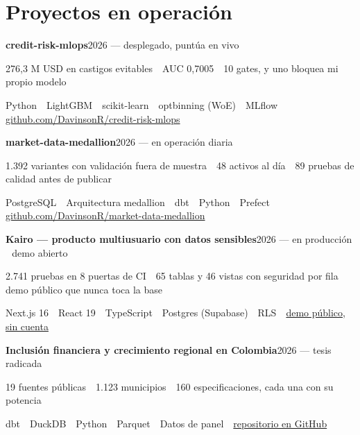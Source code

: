 \documentclass[a4paper,10pt]{article}
\newcommand{\row}[2]{\textbf{\color{ink}#1}\hfill{\small #2}\par}
\begin{document}
\section*{Proyectos en operación}
\row{credit-risk-mlops}{2026 --- desplegado, puntúa en vivo}{\small\color{ink} 276,3 M USD en castigos evitables \,\textperiodcentered\, AUC 0,7005 \,\textperiodcentered\, 10 gates, y uno bloquea mi propio modelo}\par{\small Python \,\textperiodcentered\, LightGBM \,\textperiodcentered\, scikit-learn \,\textperiodcentered\, optbinning (WoE) \,\textperiodcentered\, MLflow \,\textperiodcentered\, \href{https://github.com/DavinsonR/credit-risk-mlops}{github.com/DavinsonR/credit-risk-mlops}}\par
\vspace{1pt}
\row{market-data-medallion}{2026 --- en operación diaria}{\small\color{ink} 1.392 variantes con validación fuera de muestra \,\textperiodcentered\, 48 activos al día \,\textperiodcentered\, 89 pruebas de calidad antes de publicar}\par{\small PostgreSQL \,\textperiodcentered\, Arquitectura medallion \,\textperiodcentered\, dbt \,\textperiodcentered\, Python \,\textperiodcentered\, Prefect \,\textperiodcentered\, \href{https://github.com/DavinsonR/market-data-medallion}{github.com/DavinsonR/market-data-medallion}}\par
\vspace{1pt}
\row{Kairo --- producto multiusuario con datos sensibles}{2026 --- en producción \,\textperiodcentered\, demo abierto}{\small\color{ink} 2.741 pruebas en 8 puertas de CI \,\textperiodcentered\, 65 tablas y 46 vistas con seguridad por fila \,\textperiodcentered\, demo público que nunca toca la base}\par{\small Next.js 16 \,\textperiodcentered\, React 19 \,\textperiodcentered\, TypeScript \,\textperiodcentered\, Postgres (Supabase) \,\textperiodcentered\, RLS \,\textperiodcentered\, \href{https://kairo.davirson.com/demo}{demo público, sin cuenta}}\par
\vspace{1pt}
\row{Inclusión financiera y crecimiento regional en Colombia}{2026 --- tesis radicada}{\small\color{ink} 19 fuentes públicas \,\textperiodcentered\, 1.123 municipios \,\textperiodcentered\, 160 especificaciones, cada una con su potencia}\par{\small dbt \,\textperiodcentered\, DuckDB \,\textperiodcentered\, Python \,\textperiodcentered\, Parquet \,\textperiodcentered\, Datos de panel \,\textperiodcentered\, \href{https://github.com/DavinsonR/financial-inclusion-colombia}{repositorio en GitHub}}\par
\vspace{1pt}
\end{document}
